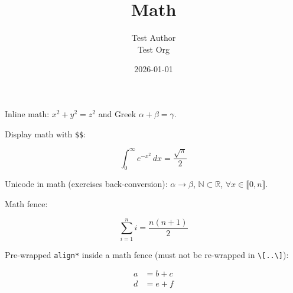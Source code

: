 \documentclass[11pt,a4paper]{article}
\title{Math}
\author{Test Author \\ Test Org}
\date{2026-01-01}
\theoremstyle{definition}
\begin{document}
\maketitle

Inline math: $x^2 + y^2 = z^2$ and Greek $\alpha + \beta = \gamma$.


Display math with \texttt{\$\$}:


\[
\int_0^\infty e^{-x^2}\,dx = \frac{\sqrt{\pi}}{2}
\]


Unicode in math (exercises back-conversion): $\alpha  \to  \beta $, $\mathbb{N} \subset  \mathbb{R}$, $\forall x \in  \llbracket 0, n\rrbracket $.


Math fence:


\[
\sum_{i=1}^n i = \frac{n(n+1)}{2}
\]


Pre-wrapped \texttt{align*} inside a math fence (must not be re-wrapped in \texttt{\textbackslash{}[..\textbackslash{}]}):


\begin{align*}
a &= b + c \\
d &= e + f
\end{align*}
\end{document}
